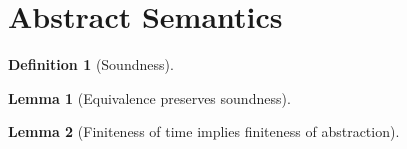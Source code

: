\documentclass{article}
\theoremstyle{definition}
\newtheorem{definition}{Definition}[section]
\newtheorem{lem}{Lemma}[section]
\begin{document}
\section{Abstract Semantics}



\begin{definition}[Soundness]
\end{definition}

\begin{lem}[Equivalence preserves soundness]
\end{lem}

\begin{lem}[Finiteness of time implies finiteness of abstraction]
\end{lem}

\printbibliography
\end{document}
